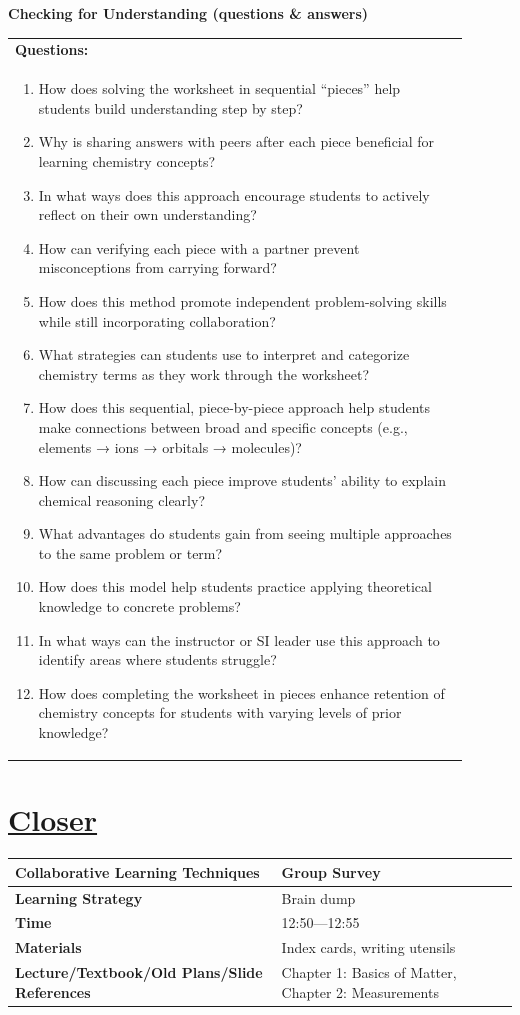 \documentclass{article}
\begin{document}
\newpage
\noindent
{\large\textbf{Checking for Understanding (questions \& answers)}}\\[0.2em]
\noindent
\begin{tabular}{|p{0.9\linewidth}|}
\hline
\textbf{Questions:} \\
\begin{enumerate}
    \item How does solving the worksheet in sequential “pieces” help students build understanding step by step?  
    \item Why is sharing answers with peers after each piece beneficial for learning chemistry concepts?  
    \item In what ways does this approach encourage students to actively reflect on their own understanding?  
    \item How can verifying each piece with a partner prevent misconceptions from carrying forward?  
    \item How does this method promote independent problem-solving skills while still incorporating collaboration?  
    \item What strategies can students use to interpret and categorize chemistry terms as they work through the worksheet?  
    \item How does this sequential, piece-by-piece approach help students make connections between broad and specific concepts (e.g., elements → ions → orbitals → molecules)?  
    \item How can discussing each piece improve students’ ability to explain chemical reasoning clearly?  
    \item What advantages do students gain from seeing multiple approaches to the same problem or term?  
    \item How does this model help students practice applying theoretical knowledge to concrete problems?  
    \item In what ways can the instructor or SI leader use this approach to identify areas where students struggle?  
    \item How does completing the worksheet in pieces enhance retention of chemistry concepts for students with varying levels of prior knowledge?  
\end{enumerate} \\
\hline  
\end{tabular}

\newpage
\noindent
\section*{\underline{Closer}}
\begin{tabular}{|p{4.2cm}|p{9.8cm}|}
\hline
\textbf{Collaborative Learning Techniques} & Group Survey\\
\hline
\textbf{Learning Strategy} & Brain dump\\
\hline
\textbf{Time} & 12:50---12:55\\
\hline
\textbf{Materials} & Index cards, writing utensils\\
\hline
\textbf{Lecture/Textbook/Old Plans/Slide References} & Chapter 1: Basics of Matter, Chapter 2: Measurements\\
\hline
\end{tabular}
\end{document}
